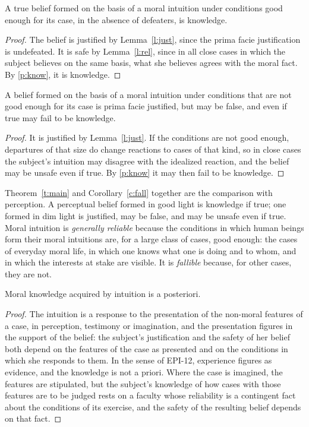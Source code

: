 \documentclass{situationist-preprint}
\begin{document}
\begin{theorem}\label{t:main}
A true belief formed on the basis of a moral intuition under conditions good enough for its case, in the absence of defeaters, is knowledge.
\end{theorem}

\begin{proof}
The belief is justified by Lemma~\ref{l:just}, since the prima facie justification is undefeated. It is safe by Lemma~\ref{l:rel}, since in all close cases in which the subject believes on the same basis, what she believes agrees with the moral fact. By \ref{p:know}, it is knowledge.
\end{proof}

\begin{corollary}[Fallibility]\label{c:fall}
A belief formed on the basis of a moral intuition under conditions that are not good enough for its case is prima facie justified, but may be false, and even if true may fail to be knowledge.
\end{corollary}

\begin{proof}
It is justified by Lemma~\ref{l:just}. If the conditions are not good enough, departures of that size do change reactions to cases of that kind, so in close cases the subject's intuition may disagree with the idealized reaction, and the belief may be unsafe even if true. By \ref{p:know} it may then fail to be knowledge.
\end{proof}

Theorem~\ref{t:main} and Corollary~\ref{c:fall} together are the comparison with perception. A perceptual belief formed in good light is knowledge if true; one formed in dim light is justified, may be false, and may be unsafe even if true. Moral intuition is \emph{generally reliable} because the conditions in which human beings form their moral intuitions are, for a large class of cases, good enough: the cases of everyday moral life, in which one knows what one is doing and to whom, and in which the interests at stake are visible. It is \emph{fallible} because, for other cases, they are not.

\begin{corollary}[A posteriori]\label{c:apost}
Moral knowledge acquired by intuition is a posteriori.
\end{corollary}

\begin{proof}
The intuition is a response to the presentation of the non-moral features of a case, in perception, testimony or imagination, and the presentation figures in the support of the belief: the subject's justification and the safety of her belief both depend on the features of the case as presented and on the conditions in which she responds to them. In the sense of EPI-12, experience figures as evidence, and the knowledge is not a priori. Where the case is imagined, the features are stipulated, but the subject's knowledge of how cases with those features are to be judged rests on a faculty whose reliability is a contingent fact about the conditions of its exercise, and the safety of the resulting belief depends on that fact.
\end{proof}
\end{document}
